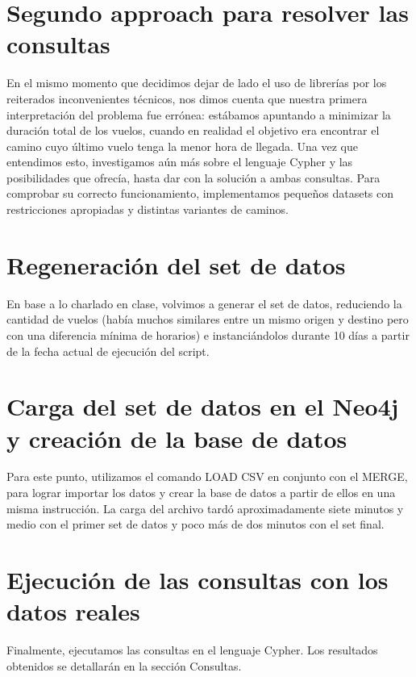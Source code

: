 \documentclass[a4paper,11pt]{article}
\begin{document}
\section{Segundo approach para resolver las consultas}
En el mismo momento que decidimos dejar de lado el uso de librerías por los reiterados inconvenientes técnicos, nos dimos cuenta que nuestra primera interpretación del problema fue errónea: estábamos apuntando a minimizar la duración total de los vuelos, cuando en realidad el objetivo era encontrar el camino cuyo último vuelo tenga la menor hora de llegada.
Una vez que entendimos esto, investigamos aún más sobre el lenguaje Cypher y las posibilidades que ofrecía, hasta dar con la solución a ambas consultas.
Para comprobar su correcto funcionamiento, implementamos pequeños datasets con restricciones apropiadas y distintas variantes de caminos.

\section{Regeneración del set de datos}
En base a lo charlado en clase, volvimos a generar el set de datos, reduciendo la cantidad de vuelos (había muchos similares entre un mismo origen y destino pero con una diferencia mínima de horarios) e instanciándolos durante 10 días a partir de la fecha actual de ejecución del script.

\section{Carga del set de datos en el Neo4j y creación de la base de datos}
Para este punto, utilizamos el comando LOAD CSV en conjunto con el MERGE, para lograr importar los datos y crear la base de datos a partir de ellos en una misma instrucción.
La carga del archivo tardó aproximadamente siete minutos y medio con el primer set de datos y poco más de dos minutos con el set final.

\section{Ejecución de las consultas con los datos reales}
Finalmente, ejecutamos las consultas en el lenguaje Cypher. Los resultados obtenidos se detallarán en la sección Consultas.

\newpage
\end{document}
